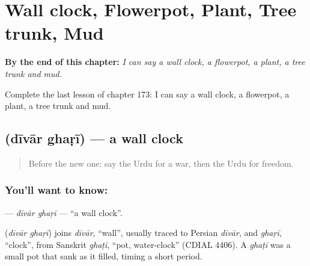 
\chapter{Wall clock, Flowerpot, Plant, Tree trunk, Mud}
\label{ch:ur-wall-clock-flowerpot-plant-tree-trunk-mud}

\begin{chapteropening}
\textbf{By the end of this chapter:} \emph{I can say a wall clock, a flowerpot, a plant, a tree trunk and mud.}

Complete the last lesson of chapter 173: I can say a wall clock, a flowerpot, a plant, a tree trunk and mud.
\end{chapteropening}

\section[\texorpdfstring{\ur{دیوار} \ur{گھڑی} (dīvār ghaṛī)}{دیوار گھڑی (dīvār ghaṛī)}]{  (dīvār ghaṛī) — a wall clock}

\label{lesson:UR-C173-divar-ghari}



\begin{quote}
Before the new one: say the Urdu for a war, then the Urdu for freedom.
\end{quote}

\subsection*{You'll want to know:  }
\textbf{ } — \emph{dīvār ghaṛī} — \textquotedblleft{}a wall clock\textquotedblright{}.

\begin{cousinweb}
\textbf{ } (\emph{dīvār ghaṛī}) joins \emph{dīvār}, \textquotedblleft{}wall\textquotedblright{}, usually traced to Persian \emph{dīvār}, and \emph{ghaṛī}, \textquotedblleft{}clock\textquotedblright{}, from Sanskrit \emph{ghaṭī}, \textquotedblleft{}pot, water-clock\textquotedblright{} (CDIAL 4406). A \emph{ghaṭī} was a small pot that sank as it filled, timing a short period.
\end{cousinweb}

